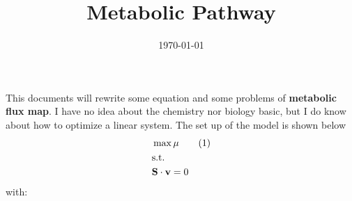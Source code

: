 \documentclass[12pt]{article}
\title{Metabolic Pathway}
\date{\today}
\newcommand\numberthis{\addtocounter{equation}{1}\tag{\theequation}}
\begin{document}
\maketitle
This documents will rewrite some equation and some problems of \textbf{metabolic flux map}. I have no idea about the chemistry nor biology basic, but I do know about how to optimize a linear system. The set up of the model is shown below
\begin{align*}
	& \max{\mu} \numberthis \\
	& \text{s.t.} \\
	& \mathbf{S} \cdot \mathbf{v} = 0
\end{align*}
with:
\end{document}
